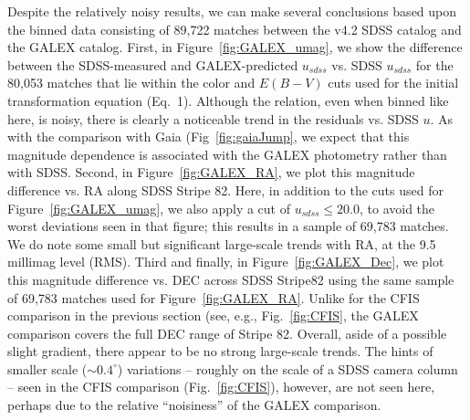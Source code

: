 \documentclass[fleqn,usenatbib]{mnras}
\begin{document}
Despite the relatively noisy results, we can make several conclusions
based upon the binned data consisting of 89,722 matches between the
v4.2 SDSS catalog and the GALEX catalog.  First, in
Figure~\ref{fig:GALEX_umag}, we show the difference between the
SDSS-measured and GALEX-predicted $u_{sdss}$ vs. SDSS $u_{sdss}$ for
the 80,053 matches that lie within the color and $E(B-V)$ cuts used
for the initial transformation equation (Eq.~1).  Although the
relation, even when binned like here, is noisy, there is clearly a
noticeable trend in the residuals vs. SDSS $u$.  As with the
comparison with Gaia (Fig~\ref{fig:gaiaJump}, we expect that this
magnitude dependence is associated with the GALEX photometry rather
than with SDSS.  Second, in Figure~\ref{fig:GALEX_RA}, we plot this
magnitude difference vs. RA along SDSS Stripe 82.  Here, in addition
to the cuts used for Figure~\ref{fig:GALEX_umag}, we also apply a cut
of $u_{sdss}\le20.0$, to avoid the worst deviations seen in that
figure; this results in a sample of 69,783 matches.  We do note some
small but significant large-scale trends with RA, at the 9.5 millimag
level (RMS).  
Third and finally, in Figure~\ref{fig:GALEX_Dec}, we plot this
magnitude difference vs. DEC across SDSS Stripe82 using the same
sample of 69,783 matches used for Figure~\ref{fig:GALEX_RA}.  Unlike
for the CFIS comparison in the previous section (see, e.g.,
Fig.~\ref{fig:CFIS}, the GALEX comparison covers the full DEC range of
Stripe 82.  Overall, aside of a possible slight gradient, there appear
to be no strong large-scale trends.  The hints of smaller scale
($\sim0.4^{\circ}$) variations -- roughly on the scale of a SDSS
camera column -- seen in the CFIS comparison (Fig.~\ref{fig:CFIS}),
however, are not seen here, perhaps due to the relative ``noisiness''
of the GALEX comparison.
\end{document}

